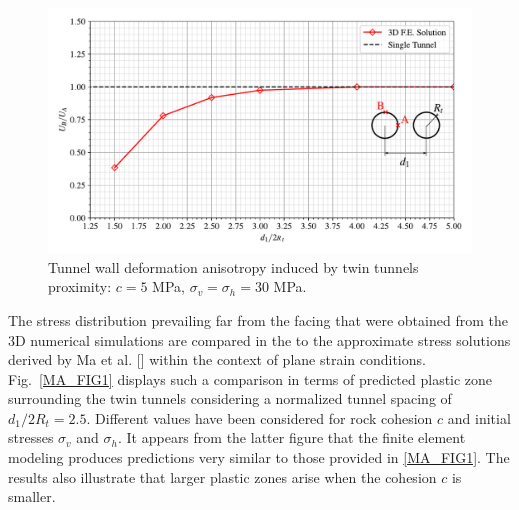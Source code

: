 \documentclass[a4paper,fleqn]{cas-sc}
\begin{document}
\begin{figure}[h!]
	\centering
	\includegraphics[scale=0.65]{MA_Relationship between Convergence in B and A.pdf}
	\caption{Tunnel wall deformation anisotropy induced by twin tunnels proximity: $c=5$ MPa, $\sigma_v = \sigma_h = 30$ MPa.}
	\label{MA_Relationship between convergence in B and A}
\end{figure}
\FloatBarrier

The stress distribution prevailing far from the facing that were obtained from the 3D numerical simulations are compared in the to the approximate stress solutions derived by Ma et al. [] within the context of plane strain conditions. Fig.~\ref{MA_FIG1} displays such a comparison in terms of predicted plastic zone surrounding the twin tunnels considering a normalized tunnel spacing of $d_1/2R_t = 2.5$.  Different values have been considered for rock cohesion $c$ and initial stresses $\sigma_v$ and $\sigma_h$. It appears from the latter figure that the finite element modeling produces predictions very similar to those provided in \ref{MA_FIG1}. The results also illustrate that larger plastic zones arise when the cohesion $c$ is smaller.
\end{document}
